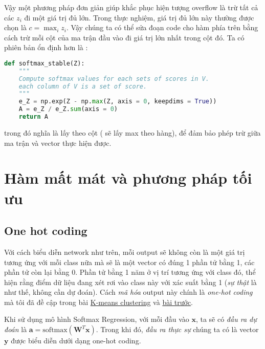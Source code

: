 Vậy một phương pháp đơn giản giúp khắc phục hiện tượng overflow là trừ tất cả các $z_i$ đi một giá trị đủ lớn. Trong thực nghiệm, giá trị đủ lớn này thường được chọn là $c = \max_i z_i$. Vậy chúng ta có thể sửa đoạn code cho hàm  phía trên bằng cách trừ mỗi cột của ma trận đầu vào  đi giá trị lớn nhất trong cột đó. Ta có phiên bản ổn định hơn là : 
 
\begin{lstlisting}[language=Python]
def softmax_stable(Z): 
    """ 
    Compute softmax values for each sets of scores in V. 
    each column of V is a set of score.     
    """ 
    e_Z = np.exp(Z - np.max(Z, axis = 0, keepdims = True)) 
    A = e_Z / e_Z.sum(axis = 0) 
    return A 
\end{lstlisting}
 
trong đó  nghĩa là lấy  theo cột ( sẽ lấy max theo hàng),  để đảm bảo phép trừ giữa ma trận  và vector  thực hiện được.  
 
 
 
 
 
 
\section{Hàm mất mát và phương pháp tối ưu }
 
 
\subsection{One hot coding }
Với cách biểu diễn network như trên, mỗi output sẽ không còn là một giá trị tương ứng với mỗi class nữa mà sẽ là một vector có đúng 1 phần tử bằng 1, các phần tử còn lại bằng 0. Phần tử bằng 1 năm ở vị trí tương ứng với class đó, thể hiện rằng điểm dữ liệu đang xét rơi vào class này với xác suất bằng 1 (\textit{sự thật} là như thế, không cần dự đoán). Cách \textit{mã hóa} output này chính là \textit{one-hot coding} mà tôi đã đề cập trong bài \href{http://machinelearningcoban.com/2017/01/01/kmeans/}{K-means clustering} và \href{http://machinelearningcoban.com/2017/02/11/binaryclassifiers/#one-vs-rest-hay-one-hot-coding}{bài trước}.  
 
Khi sử dụng mô hình Softmax Regression, với mỗi đầu vào $\mathbf{x}$, ta sẽ có \textit{đầu ra dự đoán} là $\mathbf{a} = \text{softmax}(\mathbf{W}^T\mathbf{x})$. Trong khi đó, \textit{đầu ra thực sự} chúng ta có là vector $\mathbf{y}$ được biểu diễn dưới dạng one-hot coding.  
 
